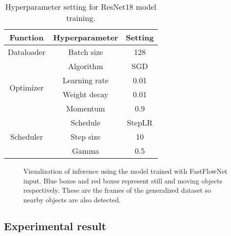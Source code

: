 \documentclass[10pt, a4paper, twocolumn]{article}
\begin{document}
    \begin{table}[t!]
    \centering
    \caption{Hyperparameter setting for ResNet18 model training.}
    \label{tab:hyperparameters}
    \begin{tabular}{c c c}
        \hline
        Function & Hyperparameter & Setting \\
        \hline\hline    
        Dataloader & Batch size & 128 \\
        \hline
        \multirow{4}{5em}{\centering Optimizer} & Algorithm & SGD \\ & Learning rate & 0.01 \\ & Weight decay & 0.01 \\ & Momentum & 0.9 \\
        \hline
        \multirow{3}{5em}{\centering Scheduler} & Schedule & StepLR \\ & Step size & 10 \\ & Gamma & 0.5 \\
        \hline
    \end{tabular}
    \end{table}

    \begin{figure*}[t!]
        \centering
        \par\smallskip
        \par\smallskip
        \caption{Visualization of inference using the model trained with FastFlowNet input. Blue boxes and red boxes represent still and moving objects respectively. These are the frames of the generalized dataset so nearby objects are also detected.}
        \label{fig:visualization}
    \end{figure*}

\subsection{\normalsize Experimental result}
\end{document}
